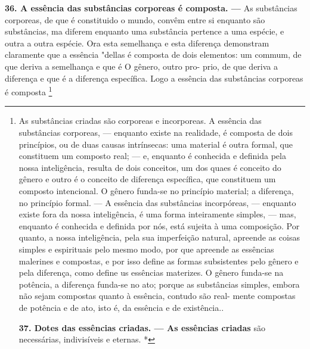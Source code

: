 \documentclass[12pt,a4paper]{article}
\newcommand{\pagmark}[1]{\quad[\textit{p.\,#1}]\quad}
\begin{document}
{{{{{{\medskip\noindent\textbf{36. A essência das substâncias corporeas é composta. —}
As substâncias corporeas, de que é constituido o mundo, convêm entre si enquanto são substâncias, ma diferem enquanto
uma substância pertence a uma espécie, e outra a outra espécie.
Ora esta semelhança e esta diferença demonstram claramente
que a essência "dellas é composta de dois elementos: um commum, de que deriva a semelhança e que é O gênero, outro pro-
\pagmark{308}
prio, de que deriva a diferença e que é a diferença específica.
 Logo a essência das substâncias corporeas é composta \footnote{As substâncias criadas são corporeas e incorporeas. A essência das
 substâncias corporeas, — enquanto existe na realidade, é composta de dois
 princípios, ou
 de duas causas intrínsecas: uma material é outra formal, que
 constituem um composto real; — e, enquanto é conhecida e definida pela
 nossa inteligência, resulta de dois conceitos, um dos quaes é conceito
 do gênero e outro é o conceito de diferença específica, que constituem um
 composto intencional. O gênero funda-se no princípio material; a diferença,
 no princípio formal. — A essência das substâncias incorpóreas, — enquanto
 existe fora da nossa inteligência, é uma forma inteiramente simples, — mas,
 enquanto é conhecida e definida por nós, está sujeita à uma composição.
 Por quanto, a nossa inteligência, pela sua imperfeição natural, apreende
 as coisas simples e espirituais pelo mesmo modo, por que apreende as
 essências malerines e compostas, e por isso define as formas subsistentes
 pelo gênero e pela diferença, como define us essências materizes. O gênero
 funda-se na potência, a diferença funda-se no ato; porque as substâncias
 simples, embora não sejam compostas quanto à essência, contudo são real-
 mente compostas de potência e de ato, isto é, da essência e de existência.. 
\pagmark{308}

\medskip\noindent\textbf{37. Dotes das essências criadas. — As essências criadas}
 são necessárias, indivisíveis e eternas. *

}}}}}}}
\end{document}
